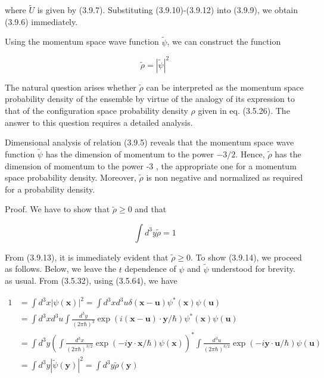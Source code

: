 \documentclass{article}
\begin{document}
where $\tilde{U}$ is given by (3.9.7). Substituting (3.9.10)-(3.9.12) into (3.9.9), we obtain (3.9.6) immediately.

Using the momentum space wave function $\tilde{\psi}$, we can construct the function
 
\begin{equation*}
\tilde{\rho}=|\tilde{\psi}|^{2} \tag{3.9.13}
\end{equation*}
 

The natural question arises whether $\tilde{\rho}$ can be interpreted as the momentum space probability density of the ensemble by virtue of the analogy of its expression to that of the configuration space probability density $\rho$ given in eq. (3.5.26). The answer to this question requires a detailed analysis.

Dimensional analysis of relation (3.9.5) reveals that the momentum space wave function $\tilde{\psi}$ has the dimension of momentum to the power $-3 / 2$. Hence, $\tilde{\rho}$ has the dimension of momentum to the power -3 , the appropriate one for a momentum space probability density. Moreover, $\tilde{\rho}$ is non negative and normalized as required for a probability density.

Proof. We have to show that $\tilde{\rho} \geq 0$ and that
 
\begin{equation*}
\int d^{3} y \tilde{\rho}=1 \tag{3.9.14}
\end{equation*}
 

From (3.9.13), it is immediately evident that $\tilde{\rho} \geq 0$. To show (3.9.14), we proceed as follows. Below, we leave the $t$ dependence of $\psi$ and $\tilde{\psi}$ understood for brevity. as usual. From (3.5.32), using (3.5.64), we have
 
\begin{align*}
1 & =\int d^{3} x|\psi(\boldsymbol{x})|^{2}=\int d^{3} x d^{3} u \delta(\boldsymbol{x}-\boldsymbol{u}) \psi^{*}(\boldsymbol{x}) \psi(\boldsymbol{u})  \tag{3.9.15}\\
& =\int d^{3} x d^{3} u \int \frac{d^{3} y}{(2 \pi \hbar)^{3}} \exp (i(\boldsymbol{x}-\boldsymbol{u}) \cdot \boldsymbol{y} / \hbar) \psi^{*}(\boldsymbol{x}) \psi(\boldsymbol{u}) \\
& =\int d^{3} y\left(\int \frac{d^{3} x}{(2 \pi \hbar)^{3 / 2}} \exp (-i \boldsymbol{y} \cdot \boldsymbol{x} / \hbar) \psi(\boldsymbol{x})\right)^{*} \int \frac{d^{3} u}{(2 \pi \hbar)^{3 / 2}} \exp (-i \boldsymbol{y} \cdot \boldsymbol{u} / \hbar) \psi(\boldsymbol{u}) \\
& =\int d^{3} y|\tilde{\psi}(\boldsymbol{y})|^{2}=\int d^{3} y \tilde{\rho}(\boldsymbol{y})
\end{align*}
 
\end{document}
